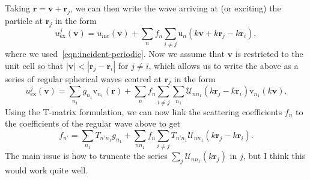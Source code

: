 \documentclass[ 12pt, a4paper]{article}
\renewcommand{\vec}[1]{\boldsymbol{#1}}
\begin{document}
Taking $\vec r = \vec v + \vec r_j$, we can then write the wave arriving at (or exciting) the particle at $\vec r_j$ in the form
\[
u^{j}_\mathrm{ex}(\vec v) = u_\mathrm{inc}(\vec v) + \sum_n f_n \sum_{i \not = j} \mathrm u_n(k \vec v + k \vec r_j - k \vec r_i),
\]
where we used~\eqref{eqn:incident-periodic}. Now we assume that $\vec v$ is restricted to the unit cell so that $|\vec v | < |\vec r_j -  \vec r_i|$ for $j \not = i$, which allows us to write the above as a series of regular spherical waves centred at $\vec r_j$ in the form
\[
u^{j}_\mathrm{ex}(\vec v) = \sum_{n_1} g_{n_1} \mathrm v_{n_1}(\vec r) + \sum_n f_n \sum_{i \not = j} \sum_{n_1} \mathcal U_{n n_1}( k \vec r_j - k \vec r_i) \mathrm v_{n_1}(k \vec v).
\]
Using the T-matrix formulation, we can now link the scattering coefficients $f_n$ to the coefficients of the regular wave above to get
\begin{equation}
  f_{n'} =  \sum_{n_1} T_{n' n_1} g_{n_1} + \sum_{n n_1} f_n \sum_{i \not = j} T_{n' n_1} \mathcal U_{n n_1}( k \vec r_j - k \vec r_i).
\end{equation}
The main issue is how to truncate the series $ \sum_j \mathcal U_{n n_1}( k \vec r_j)$ in $j$, but I think this would work quite well.

\printbibliography
\end{document}
